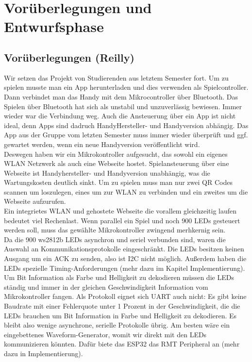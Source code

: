 \documentclass[12pt,a4paper]{article}
\begin{document}
\newpage


\section{Vorüberlegungen und Entwurfsphase}
\subsection{Vorüberlegungen (Reilly) } 
Wir setzen das Projekt von Studierenden aus letztem Semester fort. Um zu spielen musste man ein App herunterladen und dies verwenden als Spielcontroller. Dann verbindet man das Handy mit dem Mikrocontroller über Bluetooth. Das Spielen über Bluetooth hat sich als unstabil und unzuverlässig bewiesen. Immer wieder war die Verbindung weg. Auch die Ansteuerung über ein App ist nicht ideal, denn Apps sind dadruch HandyHersteller- und Handyversion abhängig. Das App aus der Gruppe vom letzten Semester muss immer wieder überprüft und ggf. gewartet werden, wenn ein neue Handyversion veröffentlicht wird. 
\vspace{1ex}\\
Deswegen haben wir ein Mikrokontroller aufgesucht, das sowohl ein eigenes WLAN Netzwerk als auch eine Webseite hostet. Spielansteuerung über eine Webseite ist Handyhersteller- und Handyversion unabhängig, was die Wartungskosten deutlich sinkt. Um zu spielen muss man nur zwei QR Codes scannen um loszulegen, eines um zur WLAN zu verbinden und ein zweites um die Webseite aufzurufen. 
\vspace{1ex}\\
Ein integrietes WLAN und gehostete Webseite die vorallem gleichzeitig laufen bedeutet viel Rechenlast. Wenn parallel ein Spiel und noch 900 LEDs gesteuert werden soll, muss das gewählte Mikrokontroller zwingend merhkernig sein.
\vspace{1ex}\\
Da die 900 ws2812b LEDs asynchron und seriel verbunden sind, waren die Auswahl an Kommunikationsprotokolle eingeschränkt. Die LEDs besitzen keinen Ausgang um ein ACK zu senden, also ist I2C nicht möglich. Außerdem haben die LEDs spezielle Timing-Anforderungen (mehr dazu im Kapitel Implementierung). Um Bit Information als Farbe und Helligkeit zu dekodieren müssen die LEDs ständig und immer in der gleichen Geschwindigkeit Information vom Mikrokontroller fangen. Als Protokoll eignet sich UART auch nicht: Es gibt keine Baudrate mit einer Fehlerquote unter 1 Prozent in der Geschwindigkeit, die die LEDs brauchen um Bit Information in Farbe und Helligkeit zu dekodieren. Es bleibt also wenige asynchrone, serielle Protokolle übrig. Am besten wäre ein eingebettenes Waveform-Generator, womit wir direkt mit den LEDs kommunizieren könnten. Dafür biete das ESP32 das RMT Peripheral an (mehr dazu in Implementierung). 
\end{document}
